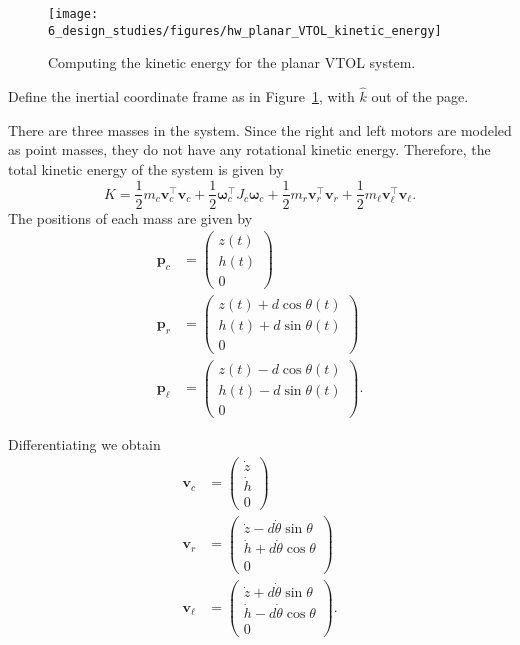 
\begin{figure}[htb]
   \centering
   \texttt{[image: 6\_design\_studies/figures/hw\_planar\_VTOL\_kinetic\_energy]} 
   \caption{Computing the kinetic energy for the planar VTOL system.}
   \label{fig:hw_planar_VTOL_kinetic_energy}
\end{figure}


Define the inertial coordinate frame as in Figure~\ref{fig:hw_planar_VTOL_kinetic_energy}, with $\hat{k}$ out of the page.  

There are three masses in the system.  Since the right and left motors are modeled as point masses, they do not have any rotational kinetic energy.  Therefore, the total kinetic energy of the system is given by
\[
K = \frac{1}{2}m_c \mathbf{v}_c^{\top} \mathbf{v}_c + \frac{1}{2}\boldsymbol{\omega}_c^{\top}J_c\boldsymbol{\omega}_c 
+ \frac{1}{2}m_r \mathbf{v}_r^{\top} \mathbf{v}_r 
+ \frac{1}{2}m_\ell \mathbf{v}_\ell^{\top} \mathbf{v}_\ell.
\]
The positions of each mass are given by
\begin{align*}
\mathbf{p}_c &= \begin{pmatrix} z(t) \\ h(t) \\ 0 \end{pmatrix} \\
\mathbf{p}_r &= \begin{pmatrix} z(t)+d\cos\theta(t) \\ h(t) + d\sin\theta(t) \\ 0 \end{pmatrix} \\
\mathbf{p}_\ell &= \begin{pmatrix} z(t)-d\cos\theta(t) \\ h(t)-d\sin\theta(t) \\ 0 \end{pmatrix}.
\end{align*}

Differentiating we obtain
\begin{align*}
\mathbf{v}_c &= \begin{pmatrix} \dot{z} \\ \dot{h} \\ 0 \end{pmatrix} \\
\mathbf{v}_r &= \begin{pmatrix} \dot{z}-d\dot{\theta}\sin\theta \\ \dot{h} + d\dot{\theta}\cos\theta \\ 0 \end{pmatrix} \\
\mathbf{v}_\ell &= \begin{pmatrix} \dot{z}+d\dot{\theta}\sin\theta \\ \dot{h}-d\dot{\theta}\cos\theta \\ 0 \end{pmatrix}.
\end{align*}

